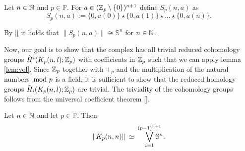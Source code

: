 \begin{defin}
  Let $n \in \mathbb{N}$ and $p\in\mathbb{P}$. For $a \in (\mathbb{Z}_p\setminus\{0\})^{n+1}$ define $S_p(n,a)$ as
  \begin{equation*}
    S_p(n,a) := \{0, a(0)\} \star \{0,a(1)\} \star \ldots \star \{0,a(n)\}.
  \end{equation*}
\end{defin}

\begin{rem}\label{rem:s}
  By \ref{} it holds that $\lVert S_p(n,a) \rVert \cong \mathbb{S}^{n}$ for $n\in\mathbb{N}$.
\end{rem}

Now, our goal is to show that the complex has all trivial reduced cohomology groups $\tilde{H}^i(K_p(n,l); \mathbb{Z}_p)$ with coefficients in $\mathbb{Z}_p$ such that we can apply lemma \ref{lem:vol}. Since $\mathbb{Z}_p$ together with $+_p$ and the multiplication of the natural numbers $\hspace*{-5px}\mod p$ is a field, it is sufficient to show that the reduced homology groups $\tilde{H}_i(K_p(n,l); \mathbb{Z}_p)$ are trivial. The triviality of the cohomology groups follows from the universal coefficient theorem \ref{}. 

\begin{lemma}
  Let $n \in \mathbb{N}$ and let $p \in \mathbb{P}$. Then
  \begin{equation*}
    \lVert K_p(n,n) \rVert \: \simeq \: \bigvee_{i=1}^{(p-1)^{n+1}}\hspace*{-10px}\mathbb{S}^{n}.
  \end{equation*}
\end{lemma}

